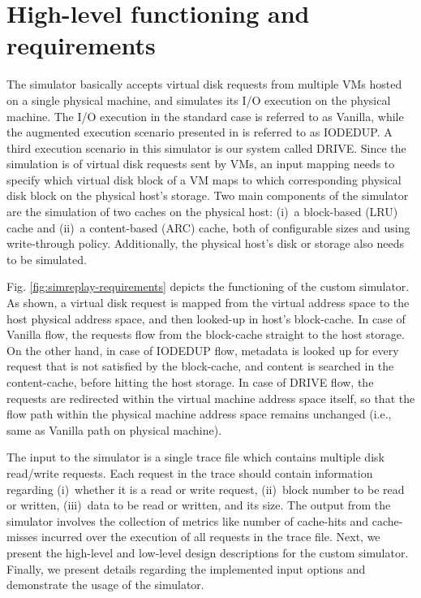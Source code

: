 \section{High-level functioning and requirements}
The simulator basically accepts virtual disk requests from multiple VMs
hosted on a single physical machine, and simulates its I/O execution
on the physical machine. The I/O execution in the standard case is referred 
to as Vanilla, while the augmented execution scenario presented
in \cite{iodedup} is referred to as IODEDUP. A third execution 
scenario in this simulator is our system called DRIVE.
Since the simulation is of virtual disk requests sent by VMs, an input 
mapping needs to specify which virtual disk block of a VM maps to which
corresponding physical disk block on the physical host's storage.
Two main components of the simulator are the simulation of two 
caches on the physical host: 
(i)~a block-based (LRU) cache and (ii)~a content-based (ARC) cache, both
of configurable sizes and using write-through policy. 
Additionally, the physical host's disk or storage also needs to be simulated. 

Fig. \ref{fig:simreplay-requirements} depicts the functioning 
of the custom simulator.
As shown, a virtual disk request is mapped from the virtual address space to
the host physical address space, and then looked-up in host's block-cache.
In case of Vanilla flow, the requests flow from the block-cache straight
to the host storage. On the other hand, in case of IODEDUP flow, 
metadata is looked up for every request that is not satisfied by the
block-cache, and content is searched in the content-cache, before hitting
the host storage. In case of DRIVE flow, the requests are redirected
within the virtual machine address space itself, so that the flow path
within the physical machine address space remains unchanged (i.e., same
as Vanilla path on physical machine).

The input to the simulator is a single trace file which contains multiple
disk read/write requests. 
Each request in the trace should contain information regarding
(i)~whether it is a read or write request,
(ii)~block number to be read or written,
(iii)~data to be read or written, and its size.
The output from the simulator involves the collection of metrics like
number of cache-hits and cache-misses incurred over the execution of
all requests in the trace file.
Next, we present the high-level and low-level design descriptions 
for the custom simulator. Finally, we present details regarding the
implemented input options and demonstrate the usage of the simulator.

